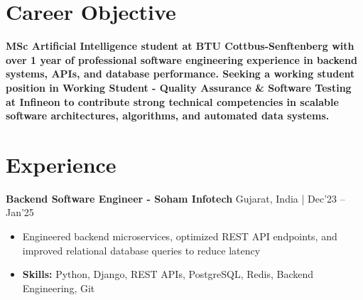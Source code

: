 \documentclass[a4paper,11pt]{article}
\begin{document}
\vspace{-7mm}

\section{\textbf{Career Objective}}
\vspace{1mm}

\textbf{MSc Artificial Intelligence student at BTU Cottbus-Senftenberg with over 1 year of professional software engineering experience in backend systems, APIs, and database performance. Seeking a working student position in Working Student - Quality Assurance \& Software Testing at Infineon to contribute strong technical competencies in scalable software architectures, algorithms, and automated data systems.}
\section{\textbf{Experience}}


\vspace{1mm}
  \textbf{Backend Software Engineer - Soham Infotech} \hfill Gujarat, India | Dec'23 -- Jan'25
\vspace{-1.5mm} %
\begin{itemize}
  \item Engineered backend microservices, optimized REST API endpoints, and improved relational database queries to reduce latency


\vspace{-2mm}
  \item \textbf{Skills:} Python, Django, REST APIs, PostgreSQL, Redis, Backend Engineering, Git
\end{itemize}
\end{document}
